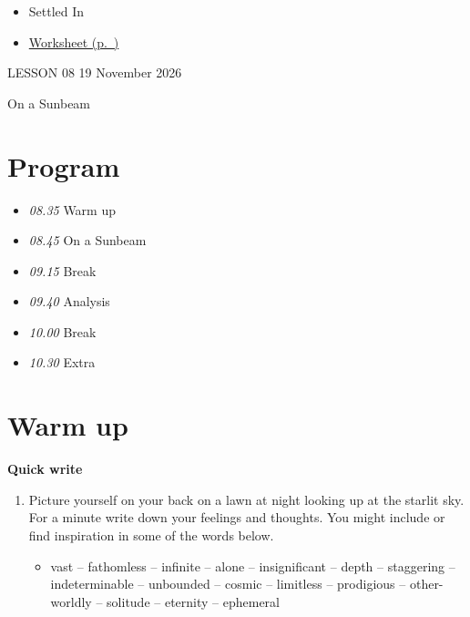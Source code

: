 \documentclass[11pt,a4paper,oneside]{book}
\newcommand{\tasktitle}[1]{{\color{blue}\bfseries #1}\par\smallskip}
\begin{document}
\begin{itemize}
\item Settled In
\item \hyperref[worksheet-19]{Worksheet (p.~\pageref*{worksheet-19})}
\end{itemize}

\clearpage{}
{\color{blue}\small LESSON 08 \hfill 19 November 2026\par}
\vspace{4mm}
{\displayfont\color{navy}\fontsize{30}{34}\selectfont On a Sunbeam\par}\vspace{4mm}

\section*{Program}

\begin{itemize}
\item \emph{08.35} Warm up
\item \emph{08.45} On a Sunbeam
\item \emph{09.15} Break
\item \emph{09.40} Analysis
\item \emph{10.00} Break
\item \emph{10.30} Extra
\end{itemize}

\section*{Warm up}
\begin{taskbox}
\tasktitle{Quick write}
\begin{enumerate}
\item Picture yourself on your back on a lawn at night looking up at the starlit sky. For a minute write down your feelings and thoughts. You might include or find inspiration in some of the words below.

\begin{itemize}
\item vast – fathomless – infinite – alone – insignificant – depth – staggering – indeterminable – unbounded – cosmic – limitless – prodigious – other-worldly – solitude – eternity – ephemeral
\end{itemize}

\end{enumerate}
\end{taskbox}
\end{document}
